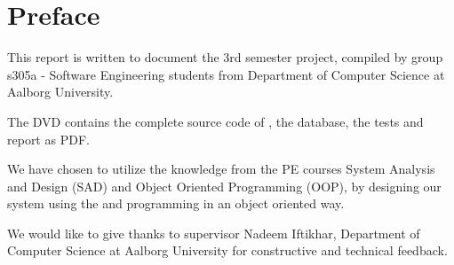 \chapter*{Preface}
\label{chap:preface}
This report is written to document the 3rd semester project, compiled by group s305a
- Software Engineering students from Department of Computer Science at Aalborg University. 


The DVD contains the complete source code of \hdesk[], the database, the tests and report as PDF.  

We have chosen to utilize the knowledge from the PE courses System Analysis and Design (SAD) and Object Oriented Programming (OOP), by designing our system using the \ooad and programming \hdesk in an object oriented way.  

We would like to give thanks to supervisor Nadeem Iftikhar, Department of Computer Science at Aalborg University for constructive and technical feedback.



